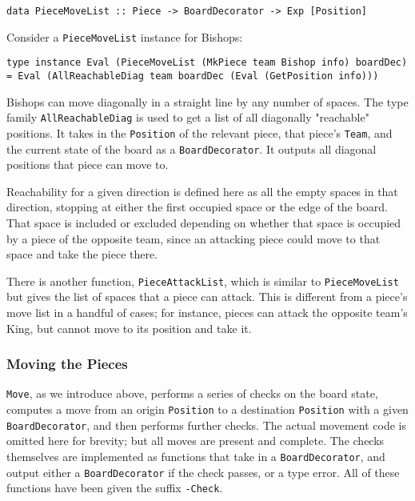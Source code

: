\documentclass[12pt, a4paper, bibliography=totocnumbered]{scrartcl}
\begin{document}
\begin{lstlisting}
data PieceMoveList :: Piece -> BoardDecorator -> Exp [Position]
\end{lstlisting}

Consider a \lstinline[basicstyle=\ttfamily]{PieceMoveList} instance for Bishops:

\begin{lstlisting}
type instance Eval (PieceMoveList (MkPiece team Bishop info) boardDec) = Eval (AllReachableDiag team boardDec (Eval (GetPosition info)))
\end{lstlisting}

Bishops can move diagonally in a straight line by any number of spaces. The type family \lstinline[basicstyle=\ttfamily]{AllReachableDiag} is used to get a list of all diagonally "reachable" positions. It takes in the \lstinline[basicstyle=\ttfamily]{Position} of the relevant piece, that piece's \lstinline[basicstyle=\ttfamily]{Team}, and the current state of the board as a \lstinline[basicstyle=\ttfamily]{BoardDecorator}. It outputs all diagonal positions that piece can move to.

Reachability for a given direction is defined here as all the empty spaces in that direction, stopping at either the first occupied space or the edge of the board. That space is included or excluded depending on whether that space is occupied by a piece of the opposite team, since an attacking piece could move to that space and take the piece there.

There is another function, \lstinline[basicstyle=\ttfamily]{PieceAttackList}, which is similar to \lstinline[basicstyle=\ttfamily]{PieceMoveList} but gives the list of spaces that a piece can attack. This is different from a piece's move list in a handful of cases; for instance, pieces can attack the opposite team's King, but cannot move to its position and take it.

\subsubsection{Moving the Pieces}

\lstinline[basicstyle=\ttfamily]{Move}, as we introduce above, performs a series of checks on the board state, computes a move from an origin \lstinline[basicstyle=\ttfamily]{Position} to a destination \lstinline[basicstyle=\ttfamily]{Position} with a given \lstinline[basicstyle=\ttfamily]{BoardDecorator}, and then performs further checks. The actual movement code is omitted here for brevity; but all moves are present and complete. The checks themselves are implemented as functions that take in a \lstinline[basicstyle=\ttfamily]{BoardDecorator}, and output either a \lstinline[basicstyle=\ttfamily]{BoardDecorator} if the check passes, or a type error. All of these functions have been given the suffix \lstinline{-Check}.
\end{document}
